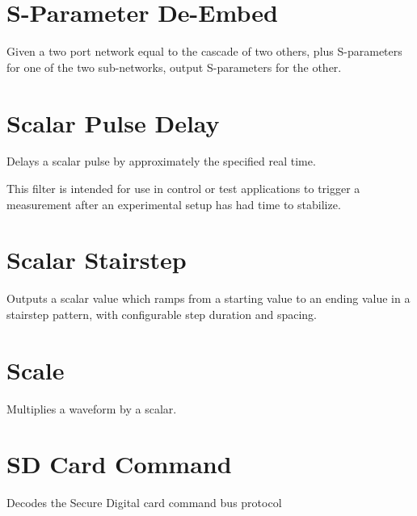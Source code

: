 \section{S-Parameter De-Embed}

Given a two port network equal to the cascade of two others, plus S-parameters for one of the two sub-networks, output
S-parameters for the other.

\pagebreak
\section{Scalar Pulse Delay}

Delays a scalar pulse by approximately the specified real time.

This filter is intended for use in control or test applications to trigger a measurement after an experimental setup has
had time to stabilize.

\pagebreak
\section{Scalar Stairstep}

Outputs a scalar value which ramps from a starting value to an ending value in a stairstep pattern, with configurable
step duration and spacing.

\pagebreak
\section{Scale}

Multiplies a waveform by a scalar.

\pagebreak
\section{SD Card Command}

Decodes the Secure Digital card command bus protocol

\pagebreak
